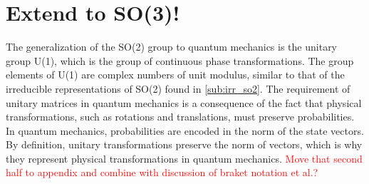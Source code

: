     \section{Extend to SO(3)!}\label{sub:phys_J}
    The generalization of the SO(2) group to quantum mechanics is the unitary group U(1), which is the group of continuous phase transformations. The group elements of U(1) are complex numbers of unit modulus, similar to that of the irreducible representations of SO(2) found in \cref{sub:irr_so2}. The requirement of unitary matrices in quantum mechanics is a consequence of the fact that physical transformations, such as rotations and translations, must preserve probabilities. In quantum mechanics, probabilities are encoded in the norm of the state vectors. By definition, unitary transformations preserve the norm of vectors, which is why they represent physical transformations in quantum mechanics. \textcolor{red}{Move that second half to appendix and combine with discussion of braket notation et al.?}

